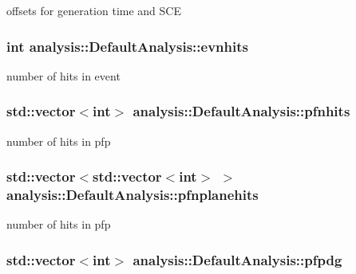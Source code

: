 offsets for generation time and S\-C\-E \hypertarget{classanalysis_1_1DefaultAnalysis_a32911aea589477a3832a4de8d134696d}{
\subsubsection[{evnhits}]{\setlength{\rightskip}{0pt plus 5cm}int analysis\-::\-Default\-Analysis\-::evnhits\hspace{0.3cm}{\ttfamily [private]}}}\label{classanalysis_1_1DefaultAnalysis_a32911aea589477a3832a4de8d134696d}
number of hits in event \hypertarget{classanalysis_1_1DefaultAnalysis_a8d010c569e35c153059a6db573b9542d}{
\subsubsection[{pfnhits}]{\setlength{\rightskip}{0pt plus 5cm}std\-::vector$<$int$>$ analysis\-::\-Default\-Analysis\-::pfnhits\hspace{0.3cm}{\ttfamily [private]}}}\label{classanalysis_1_1DefaultAnalysis_a8d010c569e35c153059a6db573b9542d}
number of hits in pfp \hypertarget{classanalysis_1_1DefaultAnalysis_a868edc3f02a7f71619edef7ee0d3df5c}{
\subsubsection[{pfnplanehits}]{\setlength{\rightskip}{0pt plus 5cm}std\-::vector$<$std\-::vector$<$int$>$ $>$ analysis\-::\-Default\-Analysis\-::pfnplanehits\hspace{0.3cm}{\ttfamily [private]}}}\label{classanalysis_1_1DefaultAnalysis_a868edc3f02a7f71619edef7ee0d3df5c}
number of hits in pfp \hypertarget{classanalysis_1_1DefaultAnalysis_a5d3ad6cd0930367cafe48e485aa19d20}{
\subsubsection[{pfpdg}]{\setlength{\rightskip}{0pt plus 5cm}std\-::vector$<$int$>$ analysis\-::\-Default\-Analysis\-::pfpdg\hspace{0.3cm}{\ttfamily [private]}}}\label{classanalysis_1_1DefaultAnalysis_a5d3ad6cd0930367cafe48e485aa19d20}

